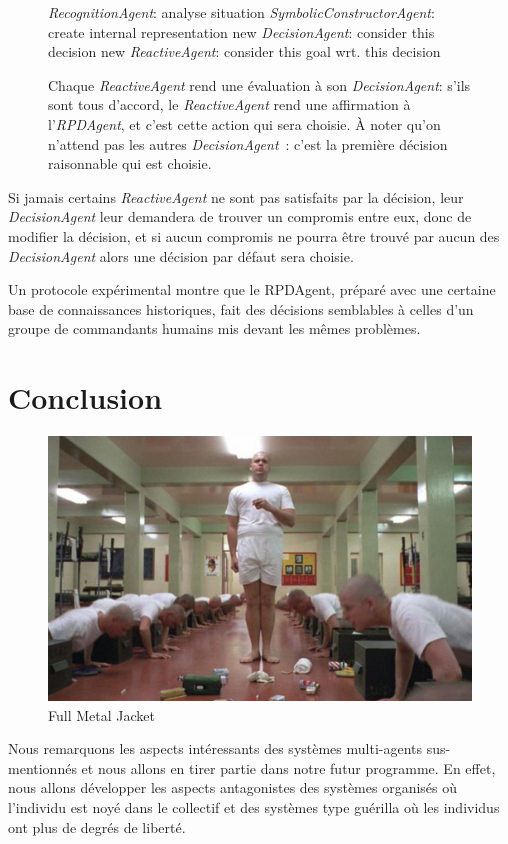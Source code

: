 \documentclass{article}
\begin{document}
\begin{figure}[H]
\begin{minipage}[H]{0.55\linewidth}
\begin{algorithmic}[1]
\STATE \emph{RecognitionAgent}: analyse situation
\STATE \emph{SymbolicConstructorAgent}: create internal representation
\STATE new \emph{DecisionAgent}: consider this decision
\STATE new \emph{ReactiveAgent}: consider this goal wrt. this decision
\ENDFOR
\ENDFOR
\end{algorithmic}
Chaque \emph{ReactiveAgent} rend une évaluation à son \emph{DecisionAgent}: s'ils sont tous d'accord, le \emph{ReactiveAgent} rend une affirmation à l'\emph{RPDAgent}, et c'est cette action qui sera choisie. À noter qu'on n'attend pas les autres \emph{DecisionAgent}~: c'est la première décision raisonnable qui est choisie.
\end{minipage}
\end{figure}
\cite{sokolowski2003}
Si jamais certains \emph{ReactiveAgent} ne sont pas satisfaits par la décision, leur \emph{DecisionAgent} leur demandera de trouver un compromis entre eux, donc de modifier la décision, et si aucun compromis ne pourra être trouvé par aucun des \emph{DecisionAgent} alors une décision par défaut sera choisie.

Un protocole expérimental montre que le RPDAgent, préparé avec une certaine base de connaissances historiques, fait des décisions semblables à celles d'un groupe de commandants humains mis devant les mêmes problèmes. 


\section{Conclusion}
\begin{figure}[H]
\includegraphics[width=\textwidth]{../ressources/donut}
\caption{Full Metal Jacket \cite{fmj_donut}}
\end{figure}
Nous remarquons les aspects intéressants des systèmes multi-agents sus-mentionnés et nous allons en tirer partie dans notre futur programme. En effet, nous allons développer les aspects antagonistes des systèmes organisés où l'individu est noyé dans le collectif et des systèmes type guérilla où les individus ont plus de degrés de liberté.

\newpage


\end{document}
